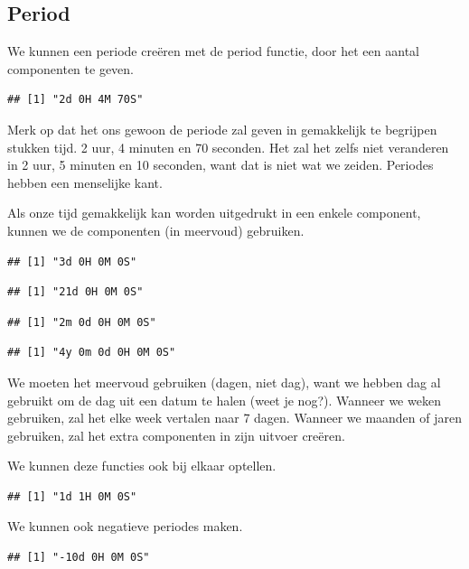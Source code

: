 \documentclass[]{tufte-book}
\begin{document}
\hypertarget{period-1}{%
\subsection{Period}\label{period-1}}

We kunnen een periode creëren met de period functie, door het een aantal componenten te geven.

\begin{verbatim}
## [1] "2d 0H 4M 70S"
\end{verbatim}

Merk op dat het ons gewoon de periode zal geven in gemakkelijk te begrijpen stukken tijd. 2 uur, 4 minuten en 70 seconden. Het zal het zelfs niet veranderen in 2 uur, 5 minuten en 10 seconden, want dat is niet wat we zeiden. Periodes hebben een menselijke kant.

Als onze tijd gemakkelijk kan worden uitgedrukt in een enkele component, kunnen we de componenten (in meervoud) gebruiken.

\begin{verbatim}
## [1] "3d 0H 0M 0S"
\end{verbatim}

\begin{verbatim}
## [1] "21d 0H 0M 0S"
\end{verbatim}

\begin{verbatim}
## [1] "2m 0d 0H 0M 0S"
\end{verbatim}

\begin{verbatim}
## [1] "4y 0m 0d 0H 0M 0S"
\end{verbatim}

We moeten het meervoud gebruiken (dagen, niet dag), want we hebben dag al gebruikt om de dag uit een datum te halen (weet je nog?). Wanneer we weken gebruiken, zal het elke week vertalen naar 7 dagen. Wanneer we maanden of jaren gebruiken, zal het extra componenten in zijn uitvoer creëren.

We kunnen deze functies ook bij elkaar optellen.

\begin{verbatim}
## [1] "1d 1H 0M 0S"
\end{verbatim}

We kunnen ook negatieve periodes maken.

\begin{verbatim}
## [1] "-10d 0H 0M 0S"
\end{verbatim}
\end{document}
